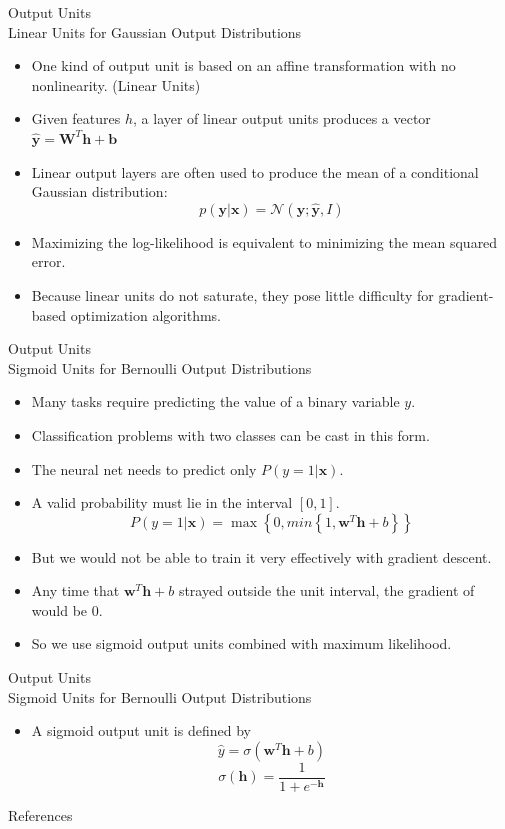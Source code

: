\documentclass[10pt]{beamer}
\begin{document}
	\begin{frame}{Output Units\\ Linear Units for Gaussian Output Distributions}
		\begin{itemize}
			\item One kind of output unit is based on an affine transformation with no nonlinearity. (Linear Units)
			\item Given features $h$, a layer of linear output units produces a vector $\hat{\bm{y}}=\bm{W}^T\bm{h}+\bm{b}$
			\item Linear output layers are often used to produce the mean of a conditional Gaussian distribution:
			$$p(\bm{y}|\bm{x})=\mathcal{N}(\bm{y};\hat{\bm{y}},\mathit{I})$$
			\item Maximizing the log-likelihood is equivalent to minimizing the mean squared error.
			\item Because linear units do not saturate, they pose little difficulty for gradient-based optimization algorithms.
		\end{itemize}
	\end{frame}

	\begin{frame}{Output Units\\ Sigmoid Units for Bernoulli Output Distributions}
		\begin{itemize}
			\item Many tasks require predicting the value of a binary variable $y$.
			\item Classification problems with two classes can be cast in this form.
			\item The neural net needs to predict only $P(y=1|\bm{x})$.
			\item A valid probability must lie in the interval $[0, 1]$.
			$$P(y=1|\bm{x})=\max\left\{0,min\left\{1,\bm{w}^T\bm{h}+b\right\}\right\}$$
			\item But we would not be able to train it very effectively with gradient descent.
			\item Any time that $\bm{w}^T\bm{h}+b$ strayed outside the unit interval, the gradient of would be 0.
			\item So we use sigmoid output units combined with maximum likelihood.
		\end{itemize}
	\end{frame}

	\begin{frame}{Output Units\\ Sigmoid Units for Bernoulli Output Distributions}
		\begin{itemize}
			\item A sigmoid output unit is defined by
			$$\hat{y}=\sigma(\bm{w}^T\bm{h}+b)$$
			$$\sigma(\bm{h})=\frac{1}{1+e^{-\bm{h}}}$$
		\end{itemize}
	\end{frame}
	


	\begin{frame}[allowframebreaks]{References}
		
		
	\end{frame}
\end{document}
